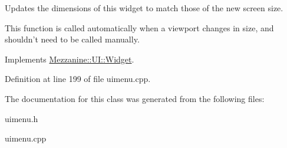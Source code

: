 Updates the dimensions of this widget to match those of the new screen size. 

This function is called automatically when a viewport changes in size, and shouldn't need to be called manually. 

Implements \hyperlink{classMezzanine_1_1UI_1_1Widget_af23f919f2912ac10230953a848c9889c}{Mezzanine::UI::Widget}.



Definition at line 199 of file uimenu.cpp.



The documentation for this class was generated from the following files:\begin{DoxyCompactItemize}
\item 
uimenu.h\item 
uimenu.cpp\end{DoxyCompactItemize}
